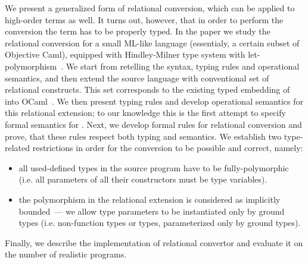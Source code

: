 We present a generalized form of relational conversion, which can be applied to high-order terms as well. It turns out, however, that
in order to perform the conversion the term has to be properly typed. In the paper we study the relational conversion for a small ML-like 
language (essentialy, a certain subset of Objective Caml), equipped with Hindley-Milner type system with let-polymorphism~\cite{Types}. 
We start from retelling the syntax, typing rules and operational semantics, and then extend the source language with conventional set of 
relational constructs. This set corresponds to the existing typed embedding of \miniKanren into OCaml~\cite{ocanren}. We then present typing rules and 
develop operational semantics for this relational extension; to our knowledge this is the first attempt to specify formal semantics for
\miniKanren. Next, we develop formal rules for relational conversion and prove, that these rules respect both typing and
semantics. We establish two type-related restrictions in order for the conversion to be possible and correct, namely:

\begin{itemize}
\item all used-defined types in the source program have to be fully-polymorphic (i.e. all parameters of all their constructors must be type variables).
\item the polymorphism in the relational extension is considered as implicitly bounded~--- we allow type parameters to be instantiated only
by ground types (i.e. non-function types or types, parameterized only by ground types).
\end{itemize}

Finally, we describe the implementation of relational convertor and evaluate it on the number of realistic programs.
